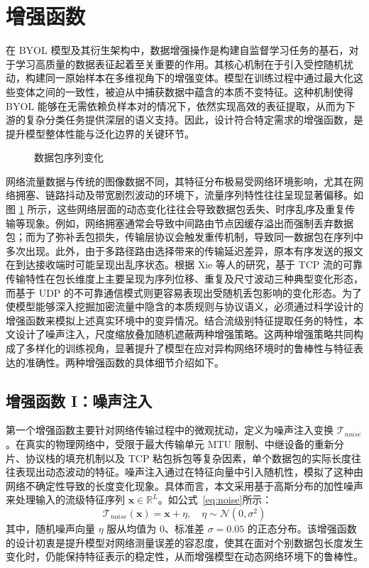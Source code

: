 \section{增强函数}
在 BYOL 模型及其衍生架构中，数据增强操作是构建自监督学习任务的基石，对于学习高质量的数据表征起着至关重要的作用。其核心机制在于引入受控随机扰动，构建同一原始样本在多维视角下的增强变体。模型在训练过程中通过最大化这些变体之间的一致性，被迫从中捕获数据中蕴含的本质不变特征。这种机制使得 BYOL 能够在无需依赖负样本对的情况下，依然实现高效的表征提取，从而为下游的复杂分类任务提供深层的语义支持。因此，设计符合特定需求的增强函数，是提升模型整体性能与泛化边界的关键环节。

\begin{figure}[ht]
  \centering
  \caption{数据包序列变化}
  \label{fig:dataaug}
\end{figure}

网络流量数据与传统的图像数据不同，其特征分布极易受网络环境影响，尤其在网络拥塞、链路抖动及带宽剧烈波动的环境下，流量序列特性往往呈现显著偏移。如图 \ref{fig:dataaug} 所示，这些网络层面的动态变化往往会导致数据包丢失、时序乱序及重复传输等现象。例如，网络拥塞通常会导致中间路由节点因缓存溢出而强制丢弃数据包；而为了弥补丢包损失，传输层协议会触发重传机制，导致同一数据包在序列中多次出现。此外，由于多路径路由选择带来的传输延迟差异，原本有序发送的报文在到达接收端时可能呈现出乱序状态。根据 Xie 等人的研究，基于 TCP 流的可靠传输特性在包长维度上主要呈现为序列位移、重复及尺寸波动三种典型变化形态，而基于 UDP 的不可靠通信模式则更容易表现出受随机丢包影响的变化形态\cite{xie2023rosetta}。为了使模型能够深入挖掘加密流量中隐含的本质规则与协议语义，必须通过科学设计的增强函数来模拟上述真实环境中的变异情况。结合流级别特征提取任务的特性，本文设计了噪声注入，尺度缩放叠加随机遮蔽两种增强策略。这两种增强策略共同构成了多样化的训练视角，显著提升了模型在应对异构网络环境时的鲁棒性与特征表达的准确性。两种增强函数的具体细节介绍如下。

\subsection{增强函数 I：噪声注入}
第一个增强函数主要针对网络传输过程中的微观扰动，定义为噪声注入变换 $\mathcal{T}_{noise}$。在真实的物理网络中，受限于最大传输单元 MTU 限制、中继设备的重新分片、协议栈的填充机制以及 TCP 粘包拆包等复杂因素，单个数据包的实际长度往往表现出动态波动的特征。噪声注入通过在特征向量中引入随机性，模拟了这种由网络不确定性导致的长度变化现象。具体而言，本文采用基于高斯分布的加性噪声来处理输入的流级特征序列 $\mathbf{x} \in \mathbb{R}^{L}$。如公式~\ref{eq:noise}所示：
\begin{equation}
  \mathcal{T}_{noise}(\mathbf{x}) = \mathbf{x} + \eta, \quad \eta \sim \mathcal{N}(0, \sigma^2)
  \label{eq:noise}
\end{equation}
其中，随机噪声向量 $\eta$ 服从均值为 0、标准差 $\sigma = 0.05$ 的正态分布。该增强函数的设计初衷是提升模型对网络测量误差的容忍度，使其在面对个别数据包长度发生变化时，仍能保持特征表示的稳定性，从而增强模型在动态网络环境下的鲁棒性。

